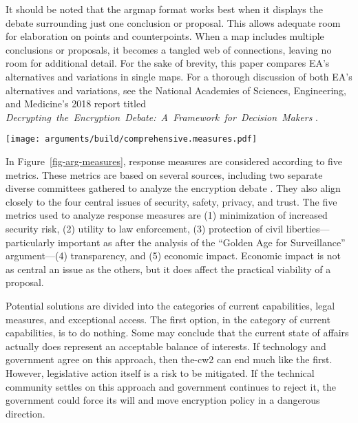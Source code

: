 \documentclass{IEEEtran}
\def\ii#1{\mbox{\textit{#1}}}
\newcommand{\myfig}[1]{Figure~\ref{#1}}
\begin{document}
It should be noted that the \ac{argmap} format works best when it displays the debate surrounding just one conclusion or
proposal. This allows adequate room for elaboration on points and counterpoints. When a map includes multiple
conclusions or proposals, it becomes a tangled web of connections, leaving no room for additional detail. For the sake
of brevity, this paper compares \ac{EA}'s alternatives and variations in single maps. For a thorough discussion of both
\ac{EA}'s alternatives and variations, see the National Academies of Sciences, Engineering, and Medicine's 2018 report
titled \ii{Decrypting the Encryption Debate: A Framework for Decision Makers} \cite{committee_decrypting_2018}.

\begin{sidewaysfigure*}
  \centering
  \texttt{[image: arguments/build/comprehensive.measures.pdf]}
  \caption{EA and its Alternatives}
  \label{fig-arg-measures}
\end{sidewaysfigure*}

In \myfig{fig-arg-measures}, response measures are considered according to five metrics. These metrics are based on
several sources, including two separate diverse committees gathered to analyze the encryption debate
\cite{committee_decrypting_2018} \cite{group_2019} \cite{varia_2018}. They also align closely to the four central issues
of security, safety, privacy, and trust. The five metrics used to analyze response measures are (1) minimization of
increased security risk, (2) utility to law enforcement, (3) protection of civil liberties---particularly important as
after the analysis of the ``Golden Age for Surveillance'' argument---(4) transparency, and (5) economic impact. Economic
impact is not as central an issue as the others, but it does affect the practical viability of a proposal.

Potential solutions are divided into the categories of current capabilities, legal measures, and exceptional access. The
first option, in the category of current capabilities, is to do nothing. Some may conclude that the current state of
affairs actually does represent an acceptable balance of interests. If technology and government agree on this approach,
then \ac{the-cw2} can end much like the first. However, legislative action itself is a risk to be mitigated. If the
technical community settles on this approach and government continues to reject it, the government could force its will
and move encryption policy in a dangerous direction.
\end{document}
